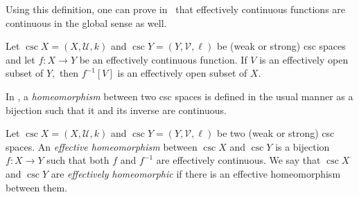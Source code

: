 \documentclass[csc]{subfiles}
\begin{document}
\noindent
Using this definition, one can prove in \RCA\ that effectively continuous functions are continuous in the global sense as well.

\begin{proposition}[\RCA]\label{P:EffContinuity}
  Let \(\csc{X}=(X,\mathcal{U},k)\) and \(\csc{Y}=(Y,\mathcal{V},\ell)\) be (weak or strong) csc spaces and let \(f:X \to Y\) be an effectively continuous function.
  If \(V\) is an effectively open subset of \(Y,\) then \(f^{-1}[V]\) is an effectively open subset of \(X.\)
\end{proposition}

\begin{comment}
  Write \(\mathcal{U} = \seq{U_i}_{i \in I}\) and \(\mathcal{V} = \seq{V_j}_{j \in J}.\)
  Let \(\phi:X \times J \to I\) witness that \(f:X \to Y\) is effectively continuous.
  Given an \eset{} \(B \subseteq J,\) the \eset{} \[A = \set{\phi(x,j) \in I : f(x) \in U_j}\] is such that \(\bigcup_{i \in A} U_i = f^{-1}[\bigcup_{j \in B} V_j.\)
\end{comment}

In \ACA, a \emph{homeomorphism} between two csc spaces is defined in the usual manner as a bijection such that it and its inverse are continuous.

\begin{definition}[\RCA]\label{D:Homeo}
  Let \(\csc{X}=(X,\mathcal{U},k)\) and \(\csc{Y}=(Y,\mathcal{V},\ell)\) be two (weak or strong) csc spaces.
  An \emph{effective homeomorphism} between \(\csc{X}\) and \(\csc{Y}\) is a bijection \(f:X \to Y\) such that both \(f\) and \(f^{-1}\) are effectively continuous.
  We say that \(\csc{X}\) and \(\csc{Y}\) are \emph{effectively homeomorphic} if there is an effective homeomorphism between them.
\end{definition}


\end{document}
